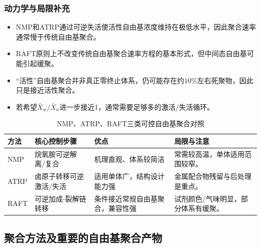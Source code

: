 ﻿\documentclass[12pt,a4paper]{article}
\renewcommand{\arraystretch}{1.18}
\begin{document}
\subsubsection{动力学与局限补充}
\begin{itemize}
  \item NMP和ATRP通过可逆失活使活性自由基浓度维持在极低水平，因此聚合速率通常慢于传统自由基聚合。
  \item RAFT原则上不改变传统自由基聚合速率方程的基本形式，但中间态自由基可能引起缓聚。
  \item “活性”自由基聚合并非真正零终止体系，仍可能存在约$10\%$左右死聚物，因此只是接近活性聚合。
  \item 若希望$\bar{X}_w/\bar{X}_n$进一步接近1，通常需要足够多的激活/失活循环。
\end{itemize}
\begin{table}[!htbp]
  \centering
  \caption{NMP、ATRP、RAFT三类可控自由基聚合对照}
  {\small
  \setlength{\tabcolsep}{5pt}
  \renewcommand{\arraystretch}{1.2}
  \begin{tabularx}{\textwidth}{C{1.5cm}C{2.5cm}C{2.6cm}Y}
    \toprule
    \textbf{方法} & \textbf{核心控制步骤} & \textbf{优点} & \textbf{局限与注意} \\
    \midrule
    NMP & 烷氧胺可逆解离/复合 & 机理直观、体系较简洁 & 常需较高温，单体适用范围较窄。 \\
    ATRP & 卤原子转移可逆激活/失活 & 适用单体广，结构设计能力强 & 金属配合物残留与后处理是重点。 \\
    RAFT & 可逆加成-裂解链转移 & 条件接近常规自由基聚合，兼容性强 & 试剂颜色/气味明显，部分体系有缓聚。 \\
    \bottomrule
  \end{tabularx}
  }
\end{table}

\subsection{聚合方法及重要的自由基聚合产物}
\end{document}
